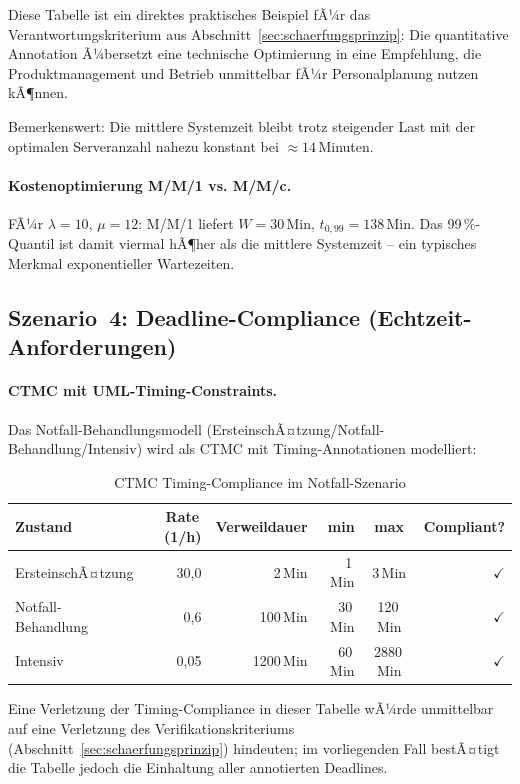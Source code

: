 ﻿\documentclass[a4paper,12pt]{report}
\theoremstyle{definition}
\begin{document}
Diese Tabelle ist ein direktes praktisches Beispiel fÃ¼r das Verantwortungskriterium aus Abschnitt~\ref{sec:schaerfungsprinzip}: Die quantitative Annotation Ã¼bersetzt eine technische Optimierung in eine Empfehlung, die Produktmanagement und Betrieb unmittelbar fÃ¼r Personalplanung nutzen kÃ¶nnen.

Bemerkenswert: Die mittlere Systemzeit bleibt trotz steigender Last mit der
optimalen Serveranzahl nahezu konstant bei $\approx 14$\,Minuten.

\paragraph{Kostenoptimierung M/M/1 vs. M/M/c.}
FÃ¼r $\lambda = 10$, $\mu = 12$: M/M/1 liefert $W = 30$\,Min,
$t_{0{,}99} = 138$\,Min. Das 99\,\%-Quantil ist damit viermal hÃ¶her
als die mittlere Systemzeit -- ein typisches Merkmal exponentieller Wartezeiten.

\subsection{Szenario~4: Deadline-Compliance (Echtzeit-Anforderungen)}

\paragraph{CTMC mit UML-Timing-Constraints.}
Das Notfall-Behandlungsmodell (ErsteinschÃ¤t\-zung/Notfall-Behandlung/Intensiv)
wird als CTMC mit Timing-Annotationen modelliert:

\begin{table}[H]
	\centering
	\begin{tabular}{@{}lrrrcr@{}}
		\toprule
		\textbf{Zustand} & \textbf{Rate}\,(1/h) & \textbf{Verweildauer} &
		\textbf{min} & \textbf{max} & \textbf{Compliant?} \\
		\midrule
		ErsteinschÃ¤tzung  &  30{,}0 &  2\,Min &  1\,Min &   3\,Min & $\checkmark$ \\
		Notfall-Behandlung &  0{,}6 & 100\,Min & 30\,Min & 120\,Min & $\checkmark$ \\
		Intensiv           & 0{,}05 & 1200\,Min & 60\,Min & 2880\,Min& $\checkmark$ \\
		\bottomrule
	\end{tabular}
	\caption{CTMC Timing-Compliance im Notfall-Szenario}
\label{tab:ctmc-notfall}
	\label{tab:ctmc-compliance}
\end{table}

Eine Verletzung der Timing-Compliance in dieser Tabelle wÃ¼rde unmittelbar auf eine Verletzung des Verifikationskriteriums (Abschnitt~\ref{sec:schaerfungsprinzip}) hindeuten; im vorliegenden Fall bestÃ¤tigt die Tabelle jedoch die Einhaltung aller annotierten Deadlines.
\end{document}
